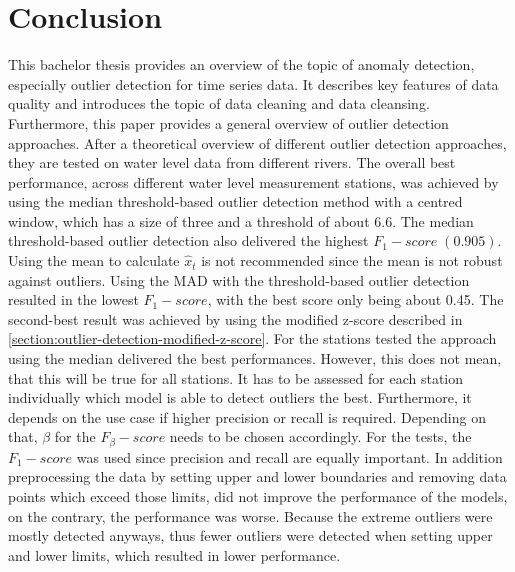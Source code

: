 \chapter{Conclusion}
This bachelor thesis provides an overview of the topic of anomaly detection, especially outlier detection for time series data. It describes key features of data quality and introduces the topic of data cleaning and data cleansing. Furthermore, this paper provides a general overview of outlier detection approaches. After a theoretical overview of different outlier detection approaches, they are tested on water level data from different rivers.
\newline
The overall best performance, across different water level measurement stations, was achieved by using the median threshold-based outlier detection method with a centred window, which has a size of three and a threshold of about 6.6. The median threshold-based outlier detection also delivered the highest $F_1-score\;(0.905)$. Using the mean to calculate $\hat{x}_t$ is not recommended since the mean is not robust against outliers. Using the \ac{MAD} with the threshold-based outlier detection resulted in the lowest $F_1-score$, with the best score only being about 0.45. The second-best result was achieved by using the modified z-score described in \autoref{section:outlier-detection-modified-z-score}. For the stations tested the approach using the median delivered the best performances. However, this does not mean, that this will be true for all stations. It has to be assessed for each station individually which model is able to detect outliers the best. Furthermore, it depends on the use case if higher precision or recall is required. Depending on that, $\beta$ for the $F_{\beta}-score$ needs to be chosen accordingly. For the tests, the $F_1-score$ was used since precision and recall are equally important. In addition preprocessing the data by setting upper and lower boundaries and removing data points which exceed those limits, did not improve the performance of the models, on the contrary, the performance was worse. Because the extreme outliers were mostly detected anyways, thus fewer outliers were detected when setting upper and lower limits, which resulted in lower performance.
\clearpage
